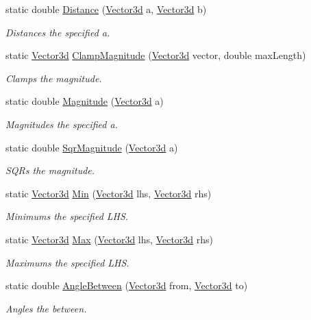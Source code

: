 \begin{DoxyCompactItemize}
static double \hyperlink{struct_unity_engine_1_1_vector3d_a26384a77846e070e38446963b2fb2729}{Distance} (\hyperlink{struct_unity_engine_1_1_vector3d}{Vector3d} a, \hyperlink{struct_unity_engine_1_1_vector3d}{Vector3d} b)
\begin{DoxyCompactList}\small\item\em Distances the specified a. \end{DoxyCompactList}\item 
static \hyperlink{struct_unity_engine_1_1_vector3d}{Vector3d} \hyperlink{struct_unity_engine_1_1_vector3d_a00aa99b9411480c0a046a946a842dbdb}{Clamp\+Magnitude} (\hyperlink{struct_unity_engine_1_1_vector3d}{Vector3d} vector, double max\+Length)
\begin{DoxyCompactList}\small\item\em Clamps the magnitude. \end{DoxyCompactList}\item 
static double \hyperlink{struct_unity_engine_1_1_vector3d_a0512c73fb2df85212fa16f764f8df2e8}{Magnitude} (\hyperlink{struct_unity_engine_1_1_vector3d}{Vector3d} a)
\begin{DoxyCompactList}\small\item\em Magnitudes the specified a. \end{DoxyCompactList}\item 
static double \hyperlink{struct_unity_engine_1_1_vector3d_a8cd9b037f522d8563af401f7e3b59e75}{Sqr\+Magnitude} (\hyperlink{struct_unity_engine_1_1_vector3d}{Vector3d} a)
\begin{DoxyCompactList}\small\item\em S\+Q\+Rs the magnitude. \end{DoxyCompactList}\item 
static \hyperlink{struct_unity_engine_1_1_vector3d}{Vector3d} \hyperlink{struct_unity_engine_1_1_vector3d_ae4576ef2e5181d8c81df5e7c4af22dbc}{Min} (\hyperlink{struct_unity_engine_1_1_vector3d}{Vector3d} lhs, \hyperlink{struct_unity_engine_1_1_vector3d}{Vector3d} rhs)
\begin{DoxyCompactList}\small\item\em Minimums the specified L\+HS. \end{DoxyCompactList}\item 
static \hyperlink{struct_unity_engine_1_1_vector3d}{Vector3d} \hyperlink{struct_unity_engine_1_1_vector3d_a5538dd876f4367f1111f47b01a8099ef}{Max} (\hyperlink{struct_unity_engine_1_1_vector3d}{Vector3d} lhs, \hyperlink{struct_unity_engine_1_1_vector3d}{Vector3d} rhs)
\begin{DoxyCompactList}\small\item\em Maximums the specified L\+HS. \end{DoxyCompactList}\item 
static double \hyperlink{struct_unity_engine_1_1_vector3d_a73a3ff3b4a22da103d3eb4b7d4aec560}{Angle\+Between} (\hyperlink{struct_unity_engine_1_1_vector3d}{Vector3d} from, \hyperlink{struct_unity_engine_1_1_vector3d}{Vector3d} to)
\begin{DoxyCompactList}\small\item\em Angles the between. \end{DoxyCompactList}\end{DoxyCompactItemize}
